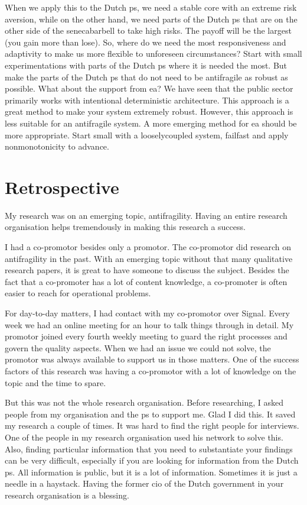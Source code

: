 When we apply this to the Dutch \gls{ps}, we need a stable core with an extreme risk aversion, while on the other hand, we need parts of the Dutch \gls{ps} that are on the other side of the \gls{senecabarbell} to take high risks. The payoff will be the largest (you gain more than lose). So, where do we need the most responsiveness and adaptivity to make us more flexible to unforeseen circumstances? Start with small experimentations with parts of the Dutch \gls{ps} where it is needed the most. But make the parts of the Dutch \gls{ps} that do not need to be \gls{antifragile} as \gls{robust} as possible. What about the support from \gls{ea}? We have seen that the public sector primarily works with intentional deterministic architecture. This approach is a great method to make your system extremely robust. However, this approach is less suitable for an \gls{antifragile} system. A more emerging method for \gls{ea} should be more appropriate. Start small with a \gls{looselycoupled} system, \gls{failfast} and apply \gls{nonmonotonicity} to advance.

\section{Retrospective}
\label{sec:retrospective}
My research was on an emerging topic, \gls{antifragility}. Having an entire research organisation helps tremendously in making this research a success. 

I had a co-promotor besides only a promotor. The co-promotor did research on \gls{antifragility} in the past. With an emerging topic without that many qualitative research papers, it is great to have someone to discuss the subject. Besides the fact that a co-promoter has a lot of content knowledge, a co-promoter is often easier to reach for operational problems. 

For day-to-day matters, I had contact with my co-promotor over Signal. Every week we had an online meeting for an hour to talk things through in detail. My promotor joined every fourth weekly meeting to guard the right processes and govern the quality aspects. When we had an issue we could not solve, the promotor was always available to support us in those matters. One of the success factors of this research was having a co-promotor with a lot of knowledge on the topic and the time to spare.

But this was not the whole research organisation. Before researching, I asked people from my organisation and the \gls{ps} to support me. Glad I did this. It saved my research a couple of times. It was hard to find the right people for interviews. One of the people in my research organisation used his network to solve this. Also, finding particular information that you need to substantiate your findings can be very difficult, especially if you are looking for information from the Dutch \gls{ps}. All information is public, but it is a lot of information. Sometimes it is just a needle in a haystack. Having the former \acrshort{cio} of the Dutch government in your research organisation is a blessing.

